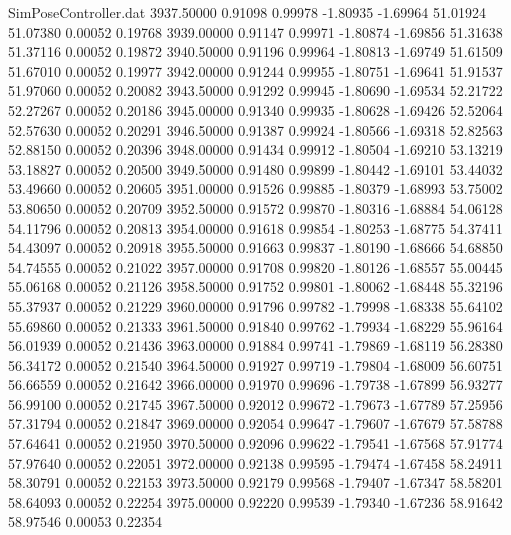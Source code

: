 \begin{filecontents}{SimPoseController.dat}
3937.50000    0.91098    0.99978    -1.80935   -1.69964   51.01924   51.07380    0.00052    0.19768
3939.00000    0.91147    0.99971    -1.80874   -1.69856   51.31638   51.37116    0.00052    0.19872
3940.50000    0.91196    0.99964    -1.80813   -1.69749   51.61509   51.67010    0.00052    0.19977
3942.00000    0.91244    0.99955    -1.80751   -1.69641   51.91537   51.97060    0.00052    0.20082
3943.50000    0.91292    0.99945    -1.80690   -1.69534   52.21722   52.27267    0.00052    0.20186
3945.00000    0.91340    0.99935    -1.80628   -1.69426   52.52064   52.57630    0.00052    0.20291
3946.50000    0.91387    0.99924    -1.80566   -1.69318   52.82563   52.88150    0.00052    0.20396
3948.00000    0.91434    0.99912    -1.80504   -1.69210   53.13219   53.18827    0.00052    0.20500
3949.50000    0.91480    0.99899    -1.80442   -1.69101   53.44032   53.49660    0.00052    0.20605
3951.00000    0.91526    0.99885    -1.80379   -1.68993   53.75002   53.80650    0.00052    0.20709
3952.50000    0.91572    0.99870    -1.80316   -1.68884   54.06128   54.11796    0.00052    0.20813
3954.00000    0.91618    0.99854    -1.80253   -1.68775   54.37411   54.43097    0.00052    0.20918
3955.50000    0.91663    0.99837    -1.80190   -1.68666   54.68850   54.74555    0.00052    0.21022
3957.00000    0.91708    0.99820    -1.80126   -1.68557   55.00445   55.06168    0.00052    0.21126
3958.50000    0.91752    0.99801    -1.80062   -1.68448   55.32196   55.37937    0.00052    0.21229
3960.00000    0.91796    0.99782    -1.79998   -1.68338   55.64102   55.69860    0.00052    0.21333
3961.50000    0.91840    0.99762    -1.79934   -1.68229   55.96164   56.01939    0.00052    0.21436
3963.00000    0.91884    0.99741    -1.79869   -1.68119   56.28380   56.34172    0.00052    0.21540
3964.50000    0.91927    0.99719    -1.79804   -1.68009   56.60751   56.66559    0.00052    0.21642
3966.00000    0.91970    0.99696    -1.79738   -1.67899   56.93277   56.99100    0.00052    0.21745
3967.50000    0.92012    0.99672    -1.79673   -1.67789   57.25956   57.31794    0.00052    0.21847
3969.00000    0.92054    0.99647    -1.79607   -1.67679   57.58788   57.64641    0.00052    0.21950
3970.50000    0.92096    0.99622    -1.79541   -1.67568   57.91774   57.97640    0.00052    0.22051
3972.00000    0.92138    0.99595    -1.79474   -1.67458   58.24911   58.30791    0.00052    0.22153
3973.50000    0.92179    0.99568    -1.79407   -1.67347   58.58201   58.64093    0.00052    0.22254
3975.00000    0.92220    0.99539    -1.79340   -1.67236   58.91642   58.97546    0.00053    0.22354

\end{filecontents}
